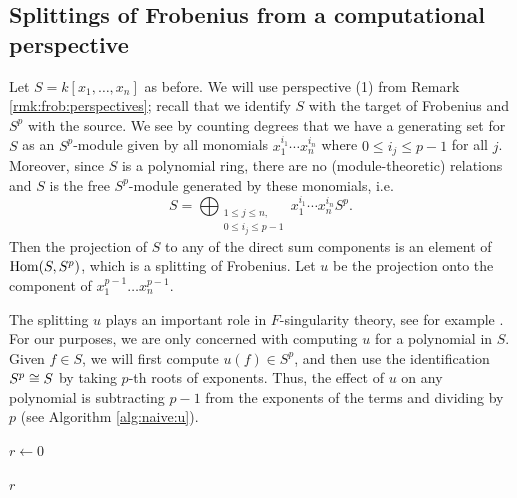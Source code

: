 \subsection{Splittings of Frobenius from a computational perspective}

Let \(S = k[x_{1}, \ldots, x_{n}]\) as before.
We will use perspective (1) from
Remark \ref{rmk:frob:perspectives};
recall that we identify
\(S\) with the target of Frobenius and
\(S^{p}\) with the source.
We see
by counting degrees
that we have a generating set for \(S\) as an
\(S^{p}\)-module given by
all monomials
\(x_{1}^{i_{1}}\cdots x_{n}^{i_{n}}\)
where \(0 \leq i_{j} \leq p-1\) for all \(j\).
Moreover, since \(S\) is a polynomial ring,
there are no (module-theoretic) relations
and
\(S\) is the free \(S^{p}\)-module generated by
these monomials, i.e.  \[
S = \bigoplus_{\substack{1 \leq j \leq n,\\ 0 \leq i_{j} \leq p-1}}^{} x_{1}^{i_{1}}\cdots x_{n}^{i_{n}} S^{p}
.\]
Then the projection of \(S\) to any of the direct sum components
is an element of \(\operatorname{Hom}(S,S^{p})\), which is a
splitting of Frobenius.
Let \(u\) be the projection onto the component of
\(x_{1}^{p-1} \ldots x_{n}^{p-1}\).

The splitting \(u\) plays an important role in \(F\)-singularity
theory, see for example 
\cite[Claim~2.6]{ma-polstra-2021-F-sing-comm-alg}.
For our purposes, we are only concerned with computing \(u\) 
for a polynomial in \(S\). 
Given \(f \in S\), we will first compute
\(u(f) \in S^{p}\), and then use the identification
\(S^{p} \cong S\) by taking \(p\)-th roots of 
exponents.
Thus, the effect 
of \(u\) on any polynomial is subtracting \(p-1\)
from the exponents of the terms and dividing by \(p\) 
(see Algorithm \ref{alg:naive:u}).


\begin{algorithm}[H]
\caption{Splitting of Frobenius}
\label{alg:naive:u}
$r \gets 0$\;


\Return $r$
\end{algorithm}

